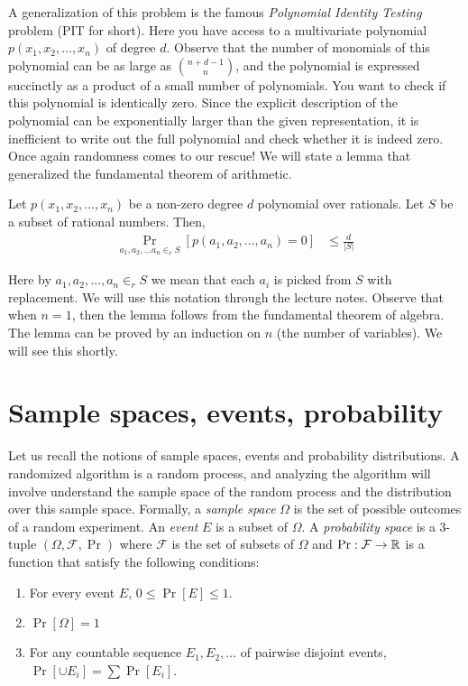 A generalization of this problem is the famous \textit{Polynomial Identity Testing} problem (PIT for short). Here you have access to a multivariate polynomial $p(x_1, x_2, \ldots, x_n)$ of degree $d$. Observe that the number of monomials of this polynomial can be as large as $\binom{n+d-1}{n}$, and the polynomial is expressed succinctly as a product of a small number of polynomials. You want to check if this polynomial is identically zero. Since the explicit description of the polynomial can be exponentially larger than the given representation, it is inefficient to write out the full polynomial and check whether it is indeed zero. Once again randomness comes to our rescue! We will state a lemma that generalized the fundamental theorem of arithmetic.

\begin{lemma}
	Let $p(x_1, x_2, \ldots, x_n)$ be a non-zero degree $d$ polynomial over rationals. Let $S$ be a subset of rational numbers. Then,
	\begin{align*}
		\Pr_{a_1, a_2, \ldots a_n \in_r S} \left[ p(a_1, a_2, \ldots, a_n) = 0  \right] &\leq \frac{d}{|S|}
	\end{align*} 
	\label{lem:dlsz}
\end{lemma}

Here by ${a_1, a_2, \ldots, a_n \in_r S}$ we mean that each $a_i$ is picked from $S$ with replacement. We will use this notation through the lecture notes. Observe that when $n=1$, then the lemma follows from the fundamental theorem of algebra. The lemma can be proved by an induction on $n$ (the number of variables). We will see this shortly.

\section{Sample spaces, events, probability}

Let us recall the notions of sample spaces, events and probability distributions. A randomized algorithm is a random process, and analyzing the algorithm will involve understand the sample space of the random process and the distribution over this sample space. Formally, a \textit{sample space} $\Omega$ is the set of possible outcomes of a random experiment. An \textit{event} $E$ is a subset of $\Omega$. A \textit{probability space} is a $3$-tuple $(\Omega, \mathcal{F},\Pr)$ where $\mathcal{F}$ is the set of subsets of $\Omega$ and $\Pr:\mathcal{F} \to \mathbb{R}$ is a function that satisfy the following conditions:
\begin{enumerate}
	\item For every event $E$, $0 \leq \Pr[E] \leq 1$.
	\item $\Pr[\Omega] = 1$
	\item For any countable sequence $E_1, E_2, \ldots $ of pairwise disjoint events, $\Pr[\cup E_i] = \sum \Pr[E_i]$.
\end{enumerate}

